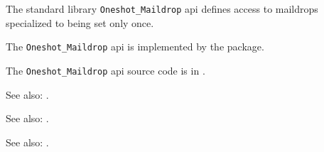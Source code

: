 
The standard library {\tt Oneshot\_Maildrop} api defines access to maildrops specialized to being set only once.

The {\tt Oneshot\_Maildrop} api is implemented by the  package.

The {\tt Oneshot\_Maildrop} api source code is in .

See also: .

See also: .

See also: .

